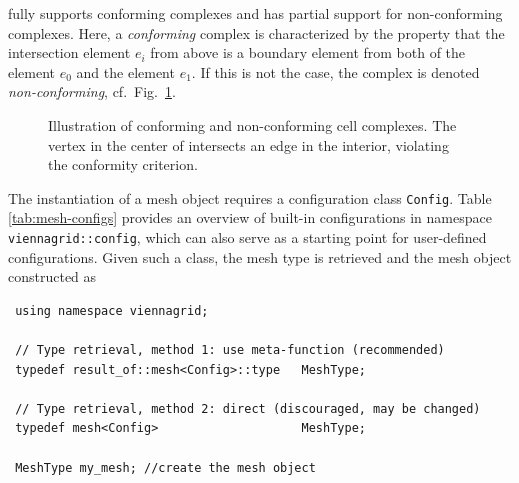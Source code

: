 {\ViennaGrid} fully supports conforming complexes and has partial support for non-conforming complexes.
Here, a \emph{conforming} complex is characterized by the property that the intersection element $e_i$  from above is a boundary element from both of the element $e_0$ and the element $e_1$.
If this is not the case, the complex is denoted \emph{non-conforming}, cf.~Fig.~\ref{fig:conformity}.

\begin{figure}[tb]
\centering
    \hspace*{2cm}
 \caption{Illustration of conforming and non-conforming cell complexes. The vertex in the center of  intersects an edge in the interior, violating the conformity criterion.}
 \label{fig:conformity}
\end{figure}

\pagebreak

The instantiation of a {\ViennaGrid} mesh object requires a configuration class \lstinline|Config|.
Table \ref{tab:mesh-configs} provides an overview of built-in configurations in namespace \lstinline|viennagrid::config|,
which can also serve as a starting point for user-defined configurations.
Given such a class, the mesh type is retrieved and the mesh object constructed as
\begin{lstlisting}
 using namespace viennagrid;

 // Type retrieval, method 1: use meta-function (recommended)
 typedef result_of::mesh<Config>::type   MeshType;

 // Type retrieval, method 2: direct (discouraged, may be changed)
 typedef mesh<Config>                    MeshType;

 MeshType my_mesh; //create the mesh object
\end{lstlisting}


